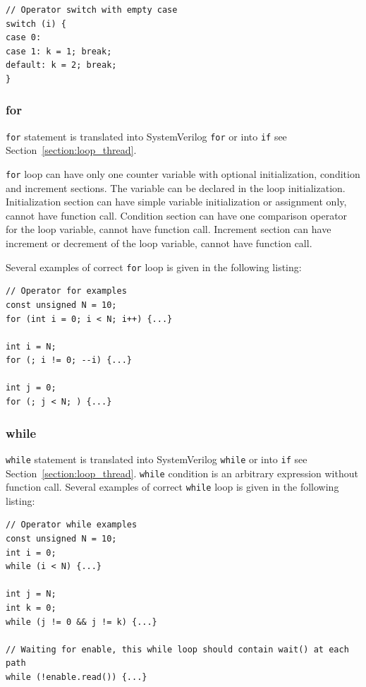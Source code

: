 \begin{lstlisting}[style=mycpp]
// Operator switch with empty case
switch (i) {
case 0: 
case 1: k = 1; break;
default: k = 2; break;
}
\end{lstlisting}


\subsubsection{for}

{\tt for} statement is translated into SystemVerilog {\tt for} or into {\tt if} see Section~\ref{section:loop_thread}. 

{\tt for} loop can have only one counter variable with optional initialization, condition and increment sections. The variable can be declared in the loop initialization. 
Initialization section can have simple variable initialization or assignment only, cannot have function call.
Condition section can have one comparison operator for the loop variable, cannot have function call.
Increment section can have increment or decrement of the loop variable, cannot have function call. 

Several examples of correct {\tt for} loop is given in the following listing:
%
\begin{lstlisting}[style=mycpp]
// Operator for examples
const unsigned N = 10;
for (int i = 0; i < N; i++) {...}

int i = N;
for (; i != 0; --i) {...}

int j = 0;
for (; j < N; ) {...}
\end{lstlisting}

\subsubsection{while}

{\tt while} statement is translated into SystemVerilog {\tt while} or into {\tt if} see Section~\ref{section:loop_thread}.
{\tt while} condition is an arbitrary expression without function call.
Several examples of correct {\tt while} loop is given in the following listing:
%
\begin{lstlisting}[style=mycpp]
// Operator while examples
const unsigned N = 10;
int i = 0;
while (i < N) {...}

int j = N;
int k = 0;
while (j != 0 && j != k) {...}

// Waiting for enable, this while loop should contain wait() at each path
while (!enable.read()) {...}
\end{lstlisting}

